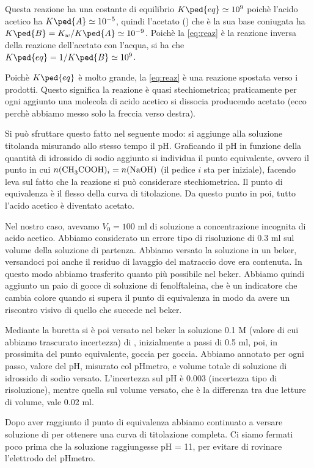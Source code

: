 Questa reazione ha una costante di equilibrio $K\ped{eq} \simeq 10^9$ poichè l'acido acetico ha $K\ped{A} \simeq 10^{-5}$,
quindi l'acetato () che è la sua base coniugata ha $K\ped{B} = K_w / K\ped{A} \simeq 10^{-9}$.
Poichè la \eqref{eq:reaz} è la reazione
inversa della reazione dell'acetato con l'acqua, si ha che $K\ped{eq} = 1/K\ped{B} \simeq 10^9$.

Poichè $K\ped{eq}$ è molto grande, la \eqref{eq:reaz} è una reazione spostata verso i prodotti. Questo significa la reazione
è quasi stechiometrica; praticamente per ogni  aggiunto una molecola di acido acetico si dissocia producendo acetato
(ecco perchè abbiamo messo solo la freccia verso destra).

Si può sfruttare questo fatto nel seguente modo: si aggiunge  alla soluzione titolanda misurando allo
stesso tempo il pH. Graficando il pH in funzione della quantità di idrossido di sodio aggiunto si individua
il punto equivalente, ovvero il punto in cui $n(\ce{CH3COOH})_i = n(\ce{NaOH})$ (il pedice $i$ sta per iniziale),
facendo leva sul fatto che la reazione si può considerare stechiometrica. Il punto di equivalenza è
il flesso della curva di titolazione. Da questo punto in poi, tutto l'acido acetico è diventato acetato.

Nel nostro caso, avevamo $V_0 = 100$ ml di soluzione a concentrazione incognita di acido acetico. Abbiamo
considerato un errore tipo di risoluzione di 0.3 ml sul volume della soluzione di partenza. Abbiamo versato la soluzione in un
beker, versandoci poi anche il residuo di lavaggio del matraccio dove era contenuta. In questo modo abbiamo
trasferito quanto più  possibile nel beker. Abbiamo quindi aggiunto un paio di gocce
di soluzione di fenolftaleina, che è un indicatore che cambia colore quando si supera il punto di equivalenza
in modo da avere un riscontro visivo di quello che succede nel beker.

Mediante la buretta si è poi versato nel beker la soluzione 0.1 M (valore di cui abbiamo trascurato incertezza)
di , inizialmente a
passi di 0.5 ml, poi, in prossimita del punto equivalente, goccia per goccia. Abbiamo annotato per ogni passo, valore
del pH, misurato col pHmetro, e volume totale di soluzione di idrossido di sodio versato. L'incertezza sul pH è 0.003
(incertezza tipo di risoluzione), mentre quella sul volume versato, che è la differenza tra due letture di volume,
vale 0.02 ml. 

Dopo aver raggiunto il punto di equivalenza abbiamo continuato a versare soluzione di  per
ottenere una curva di titolazione completa. Ci siamo fermati poco prima che la soluzione raggiungesse pH = 11,
per evitare di rovinare l'elettrodo del pHmetro.
